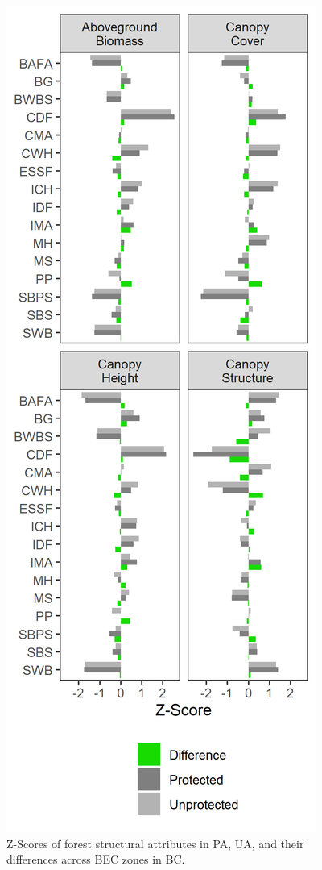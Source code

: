\documentclass[10pt,oneside]{article}
\makeatletter
\def\maxwidth{\ifdim\Gin@nat@width>\linewidth\linewidth
\else\Gin@nat@width\fi}
\let\Oldincludegraphics\includegraphics
\renewcommand{\includegraphics}[1]{\Oldincludegraphics[width=\maxwidth]{#1}}
\makeatother
\begin{document}
\begin{figure}
\hypertarget{fig:structure-3d-scatter}{%
\centering
\includegraphics{figures/fstruct_zscores.png}
\caption{Z-Scores of forest structural attributes in PA, UA, and their
differences across BEC zones in BC.}\label{fig:structure-3d-scatter}
}
\end{figure}
\end{document}
